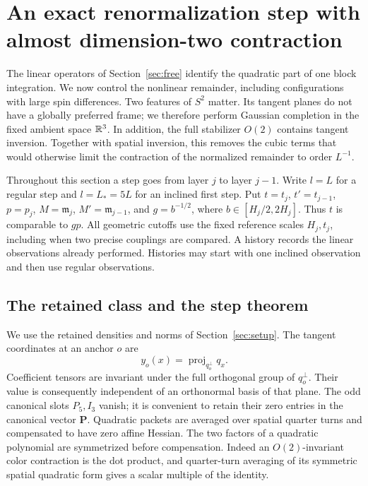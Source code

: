 \section{An exact renormalization step with almost dimension-two \texorpdfstring{\mbox{contraction}}{contraction}}
\label{sec:rg}

The linear operators of Section~\ref{sec:free} identify the quadratic
part of one block integration.  We now control the nonlinear remainder,
including configurations with large spin differences.  Two features of
$S^2$ matter.  Its tangent planes do not have a globally preferred frame;
we therefore perform Gaussian completion in the fixed ambient space
$\mathbb R^3$.  In addition, the full stabilizer $O(2)$ contains tangent
inversion.  Together with spatial inversion, this removes the cubic
terms that would otherwise limit the contraction of the normalized
remainder to order $L^{-1}$.

Throughout this section a step goes from layer $j$ to layer $j-1$.
Write $l=L$ for a regular step and $l=L_*=5L$ for an inclined
first step.  Put $t=t_j$, $t'=t_{j-1}$, $p=p_j$,
$M=\mathfrak m_j$, $M'=\mathfrak m_{j-1}$, and
$g=b^{-1/2}$, where $b\in[H_j/2,2H_j]$.  Thus $t$ is comparable to
$gp$.  All geometric cutoffs use the fixed reference scales $H_j,t_j$,
including when two precise couplings are compared.  A history records
the linear observations already performed.  Histories may start with
one inclined observation and then use regular observations.

\subsection{The retained class and the step theorem}

We use the retained densities and norms of Section~\ref{sec:setup}.  The tangent coordinates at an anchor $o$ are
\[
 y_o(x)=\operatorname{proj}_{q_o^\perp}q_x.
\]
Coefficient tensors are invariant under the full orthogonal group of
$q_o^\perp$.  Their value is consequently independent of an
orthonormal basis of that plane.  The odd canonical slots $P_5,I_3$
vanish; it is convenient to retain their zero entries in the canonical
vector $\mathbf P$.  Quadratic packets are averaged over spatial
quarter turns and compensated to have zero affine Hessian.  The two
factors of a quadratic polynomial are symmetrized before compensation.
Indeed an $O(2)$-invariant color contraction is the dot product, and
quarter-turn averaging of its symmetric spatial quadratic form gives
a scalar multiple of the identity.

